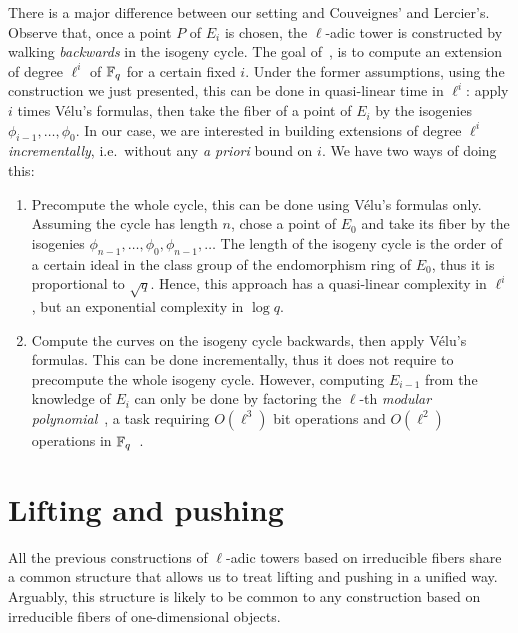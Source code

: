 \documentclass{sig-alternate}
\begin{document}
\begin{remark}
  \label{rk:cycle}
  There is a major difference between our setting and Couveignes' and
  Lercier's. Observe that, once a point $P$ of $E_i$ is chosen, the
  $\ell$-adic tower is constructed by walking \emph{backwards} in the
  isogeny cycle. The goal of~\cite{couveignes+lercier11}, is to
  compute an extension of degree $\ell^i$ of $\mathbb{F}_q$ for a certain
  fixed $i$. Under the former assumptions, using the construction we
  just presented, this can be done in quasi-linear time in $\ell^i$:
  apply $i$ times Vélu's formulas, then take the fiber of a point of
  $E_i$ by the isogenies $\phi_{i-1}, \ldots, \phi_0$. In our case, we
  are interested in building extensions of degree $\ell^i$
  \emph{incrementally}, i.e.\ without any \emph{a priori} bound on
  $i$. We have two ways of doing this:
  \begin{enumerate}
  \item Precompute the whole cycle, this can be done using Vélu's
    formulas only. Assuming the cycle has length $n$, chose a point of
    $E_0$ and take its fiber by the isogenies $\phi_{n-1}, \ldots,
    \phi_0, \phi_{n-1}, \ldots$ The length of the isogeny cycle is the
    order of a certain ideal in the class group of the endomorphism
    ring of $E_0$, thus it is proportional to $\sqrt{q}$. Hence, this
    approach has a quasi-linear complexity in $\ell^i$, but an
    exponential complexity in $\log q$.
  \item Compute the curves on the isogeny cycle backwards, then apply
    Vélu's formulas. This can be done incrementally, thus it does not
    require to precompute the whole isogeny cycle. However, computing
    $E_{i-1}$ from the knowledge of $E_i$ can only be done by
    factoring the $\ell$-th \emph{modular polynomial}~\cite{schoof95},
    a task requiring $O(\ell^3)$ bit operations and $O(\ell^2)$
    operations in $\mathbb{F}_q$~\cite{sutherland10:modpol}.
  \end{enumerate}
\end{remark}


\section{Lifting and pushing}
\label{sec:lift-push}

All the previous constructions of $\ell$-adic towers based on
irreducible fibers share a common structure that allows us to treat
lifting and pushing in a unified way. Arguably, this structure is
likely to be common to any construction based on irreducible fibers of
one-dimensional objects.
\end{document}
